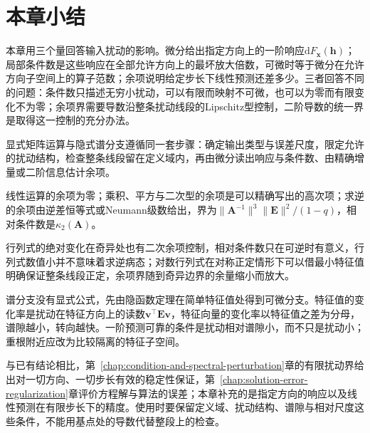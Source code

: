 \FloatBarrier
\section{本章小结}
\label{sec:differential-perturbation-summary}

本章用三个量回答输入扰动的影响。微分给出指定方向上的一阶响应$\mathrm dF_{\bm x}(\bm h)$；局部条件数是这些响应在全部允许方向上的最坏放大倍数，可微时等于微分在允许方向子空间上的算子范数；余项说明给定步长下线性预测还差多少。三者回答不同的问题：条件数只描述无穷小扰动，可以有限而映射不可微，也可以为零而有限变化不为零；余项界需要导数沿整条扰动线段的Lipschitz型控制，二阶导数的统一界是取得这一控制的充分办法。

显式矩阵运算与隐式谱分支遵循同一套步骤：确定输出类型与误差尺度，限定允许的扰动结构，检查整条线段留在定义域内，再由微分读出响应与条件数、由精确增量或二阶信息估计余项。

线性运算的余项为零；乘积、平方与二次型的余项是可以精确写出的高次项；求逆的余项由逆差恒等式或Neumann级数给出，界为$\lVert\bm A^{-1}\rVert^3\lVert\bm E\rVert^2/(1-q)$，相对条件数是$\kappa_2(\bm A)$。

行列式的绝对变化在奇异处也有二次余项控制，相对条件数只在可逆时有意义，行列式数值小并不意味着求逆病态；对数行列式在对称正定情形下可以借最小特征值明确保证整条线段正定，余项界随到奇异边界的余量缩小而放大。

谱分支没有显式公式，先由隐函数定理在简单特征值处得到可微分支。特征值的变化率是扰动在特征方向上的读数$\bm v^\top\bm E\bm v$，特征向量的变化率以特征值之差为分母，谱隙越小，转向越快。一阶预测可靠的条件是扰动相对谱隙小，而不只是扰动小；重根附近应改为比较隔离的特征子空间。

与已有结论相比，第~\ref{chap:condition-and-spectral-perturbation}章的有限扰动界给出对一切方向、一切步长有效的稳定性保证，第~\ref{chap:solution-error-regularization}章评价方程解与算法的误差；本章补充的是指定方向的响应以及线性预测在有限步长下的精度。使用时要保留定义域、扰动结构、谱隙与相对尺度这些条件，不能用基点处的导数代替整段上的检查。
